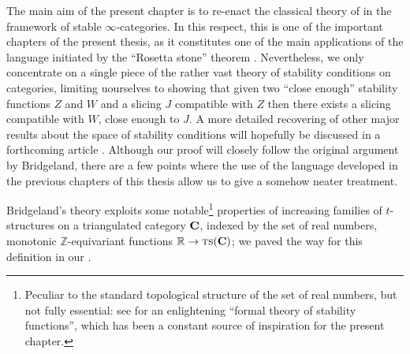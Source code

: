 The main aim of the present chapter is to re\hyp{}enact the classical theory of \cite{Brid} in the framework of stable $\infty$\hyp{}categories. In this respect, this is one of the important chapters of the present thesis, as it constitutes one of the main applications of the language initiated by the ``Rosetta stone'' theorem . Nevertheless, we only concentrate on a single piece of the rather vast theory of stability conditions on categories, limiting uourselves to showing that given two ``close enough'' stability functions $Z$ and $W$ and a slicing $J$ compatible with $Z$ then there exists a slicing compatible with $W$, close enough to $J$. A more detailed  recovering of other major results about the space of stability conditions will hopefully be discussed in a forthcoming article \cite{infty-stab}. Although our proof will closely follow the original argument by Bridgeland, there are a few points where the use of the language developed in the previous chapters of this thesis allow us to give a somehow neater treatment.

Bridgeland's theory exploits some notable\footnote{Peculiar to the standard topological structure of the set of real numbers, but not fully essential: see \cite{GKR} for an enlightening ``formal theory of stability functions'', which has been a constant source of inspiration for the present chapter.} properties of increasing families of $t$\hyp{}structures on a triangulated category $\textbf{C}$, indexed by the set of real numbers, \ie monotonic $\mathbb{Z}$\hyp{}equivariant functions $\mathbb R\to \textsc{ts}(\textbf{C})$; we paved the way for this definition in our \achap {}.

